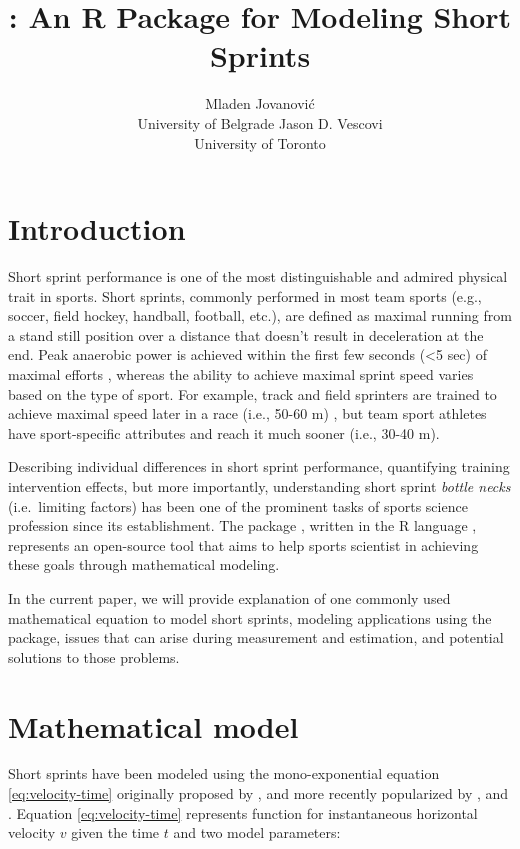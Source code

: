 \documentclass[
]{jss}
\author{
Mladen Jovanović\\University of Belgrade \And Jason D. Vescovi\\University of Toronto
}
\title{\pkg{shorts}: An R Package for Modeling Short Sprints}
\begin{document}
\hypertarget{introduction}{%
\section{Introduction}\label{introduction}}

Short sprint performance is one of the most distinguishable and admired physical trait in sports. Short sprints, commonly performed in most team sports (e.g., soccer, field hockey, handball, football, etc.), are defined as maximal running from a stand still position over a distance that doesn't result in deceleration at the end. Peak anaerobic power is achieved within the first few seconds (\textless5 sec) of maximal efforts \citep{mangineSpeedForcePower2014}, whereas the ability to achieve maximal sprint speed varies based on the type of sport. For example, track and field sprinters are trained to achieve maximal speed later in a race (i.e., 50-60 m) \citep{ward-smithEnergyConversionStrategies2001}, but team sport athletes have sport-specific attributes and reach it much sooner (i.e., 30-40 m)\citep{brownAssessmentLinearSprinting2004}.

Describing individual differences in short sprint performance, quantifying training intervention effects, but more importantly, understanding short sprint \emph{bottle necks} (i.e.~limiting factors) has been one of the prominent tasks of sports science profession since its establishment. The  package \citep{R-shorts}, written in the R language \citep{R-base}, represents an open-source tool that aims to help sports scientist in achieving these goals through mathematical modeling.

In the current paper, we will provide explanation of one commonly used mathematical equation to model short sprints, modeling applications using the  package, issues that can arise during measurement and estimation, and potential solutions to those problems.

\hypertarget{mathematical-model}{%
\section{Mathematical model}\label{mathematical-model}}

Short sprints have been modeled using the mono-exponential equation \eqref{eq:velocity-time} originally proposed by \citet{doi:10.1098/rspb.1927.0035}, and more recently popularized by \citet{clarkNFLCombine40Yard2017}, and \citet{samozinoSimpleMethodMeasuring2016}. Equation \eqref{eq:velocity-time} represents function for instantaneous horizontal velocity \(v\) given the time \(t\) and two model parameters:
\end{document}
